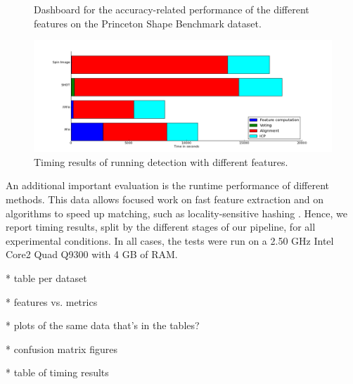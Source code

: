 \begin{figure}[h]
  \caption{Dashboard for the accuracy-related performance of the different features on the Princeton Shape Benchmark dataset.}
  \label{fig:PSB_dashboard}
\end{figure}

\begin{figure}[thpb]
\centering
\includegraphics[width=1\linewidth]{../figures/PSB/PFH-FPFH-SHOT-SPIN_IMAGE_timing_test.png}
\caption{Timing results of running detection with different features.}
\label{fig:timing}
\end{figure}

%

An additional important evaluation is the runtime performance of different methods.
This data allows focused work on fast feature extraction and on algorithms to speed up matching, such as locality-sensitive hashing \cite{Frome2004}.
Hence, we report timing results, split by the different stages of our pipeline, for all experimental conditions.
In all cases, the tests were run on a 2.50 GHz Intel Core2 Quad Q9300 with 4 GB of RAM.

* table per dataset

* features vs. metrics

* plots of the same data that's in the tables?

* confusion matrix figures

* table of timing results
